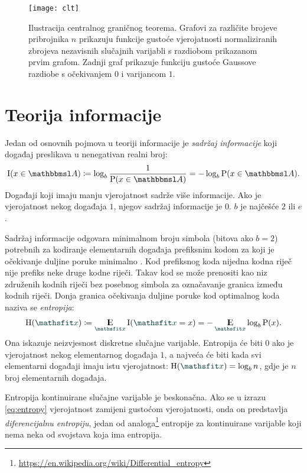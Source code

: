 \documentclass[utf8, diplomski, lmodern]{fer}
\begin{document}
\begin{figure}
	\centering
	\texttt{[image: clt]}
	\caption{Ilustracija centralnog graničnog teorema. Grafovi za različite brojeve pribrojnika $n$ prikazuju funkcije gustoće vjerojatnosti normaliziranih zbrojeva nezavisnih slučajnih varijabli s razdiobom prikazanom prvim grafom. Zadnji graf prikazuje funkciju gustoće Gaussove razdiobe s očekivanjem $0$ i varijancom $1$.}
	\label{fig:clt}
\end{figure}



\section{Teorija informacije}

Jedan od osnovnih pojmova u teoriji informacije je \emph{sadržaj informacije} koji događaj preslikava u nenegativan realni broj:
\begin{align}
\I(x\in\set A)\coloneqq\log_b \frac{1}{\P(x\in\set A)} = -\log_b \P(x\in\set A) \text{.}
\end{align}
Događaji koji imaju manju vjerojatnost sadrže više informacije. Ako je vjerojatnost nekog događaja $1$, njegov sadržaj informacije je $0$. $b$ je najčešće $2$ ili $e$.

Sadržaj informacije odgovara minimalnom broju simbola (bitova ako $b=2$) potrebnih za kodiranje elementarnih događaja prefiksnim kodom za koji je očekivanje duljine poruke minimalno \citep{Olah:2015:VIT}. Kod prefiksnog koda nijedna kodna riječ nije prefiks neke druge kodne riječi. Takav kod se može prenositi kao niz združenih kodnih riječi bez posebnog simbola za označavanje granica između kodnih riječi. Donja granica očekivanja duljine poruke kod optimalnog koda naziva se \emph{entropija}:
\begin{align}\label{eq:entropy}
\H(\rvar x) \coloneqq  \E_{\rvar x}\I(\rvar x=x) = -\E_{\rvar x}\log_b \P(x) \text{.}
\end{align}
Ona iskazuje neizvjesnost diskretne slučajne varijable. Entropija će biti $0$ ako je vjerojatnost nekog elementarnog događaja $1$, a najveća će biti kada svi elementarni događaji imaju istu vjerojatnost: $\H(\rvar x)=\log_b n$, gdje je $n$ broj elementarnih događaja. 

Entropija kontinuirane slučajne varijable je beskonačna. Ako se u izrazu \eqref{eq:entropy} vjerojatnost zamijeni gustoćom vjerojatnosti, onda on predstavlja \emph{diferencijalnu entropiju}, jedan od analoga\footnote{\url{https://en.wikipedia.org/wiki/Differential_entropy}} entropije za kontinuirane varijable koji nema neka od svojstava koja ima entropija.
\end{document}

